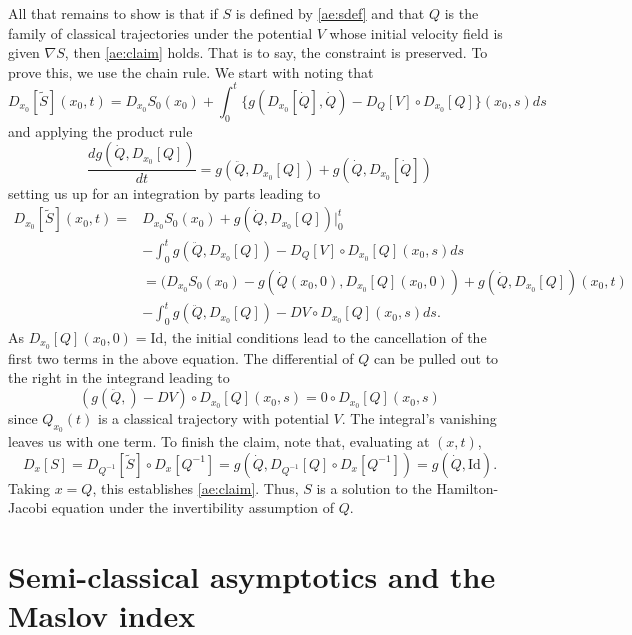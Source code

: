 \documentclass[11pt]{article}
\theoremstyle{remark}
\begin{document}
All that remains to show is that if $S$ is defined by \eqref{ae:sdef}
and that $Q$ is the family of classical trajectories under the
potential $V$ whose initial velocity field is given $\nabla S$, then
\eqref{ae:claim} holds. That is to say, the constraint is
preserved. To prove this, we use the chain rule. 
We start with noting that
\[
D_{x_0} [\tilde{S}] (x_0,t) = D_{x_0} S_0 (x_0) + \int_0^t
\{g( D_{x_0} [\dot Q], \dot Q) - D_Q [V] \circ D_{x_0}[Q]\}(x_0, s) ds     
\] 
and applying the product rule
\[
\ensuremath{\frac{d{g(\dot Q, D_{x_0} [Q] )}}{d{t}}} = g(\ddot{Q}, D_{x_0} [Q])  + g(
\dot Q,  D_{x_0} [\dot Q]) 
\]
 setting us up for an integration by parts leading to 
\[
\begin{split}
D_{x_0} [\tilde{S}] (x_0,t)
=&  D_{x_0} S_0 (x_0) + g(\dot Q, D_{x_0} [Q] )\vert_0^t   
\\&
-\int_0^t 
 {g(\ddot{Q}, D_{x_0} [Q]) -D_Q[V] \circ D_{x_0} [Q]} (x_0, s) ds   
\\ &
=(  D_{x_0} S_0 (x_0) - g(\dot Q (x_0,0) , D_{x_0} [Q] (x_0,0) ) 
+ g(\dot Q, D_{x_0} [Q] ) (x_0,t) 
\\& -  \int_0^t 
 {g(\ddot{Q}, D_{x_0} [Q]) -DV \circ D_{x_0} [Q]} (x_0, s) ds.
\end{split}
\]
As $D_{x_0} [Q] (x_0,0) = \ensuremath{\text{Id}}$, the initial conditions lead to the
cancellation of the first two terms in the above equation. 
The differential of $Q$ can be pulled out to the right in the
integrand leading to
\[
( g(\ddot{Q}, ) -DV )\circ D_{x_0} [Q] (x_0, s) 
= 0 \circ D_{x_0} [Q] (x_0, s)
\]
since $Q_{x_0} (t)$ is a classical trajectory with potential
$V$. The integral's vanishing leaves us with one term.
To finish the claim, note that, evaluating at $(x,t)$,  
\[
D_x [S]  = D_{Q^{-1}} [\tilde S] \circ D_x [Q^{-1}]   
= g(\dot Q, D_{Q^{-1}} [Q] \circ D_x [Q^{-1}]  )  
= g(\dot Q, \ensuremath{\text{Id}}) . 
\]
Taking $x = Q$, this establishes \eqref{ae:claim}. Thus, $S$ is a
solution to the Hamilton-Jacobi equation under the invertibility
assumption of $Q$. 

\section{Semi-classical asymptotics and the Maslov index}
\end{document}
